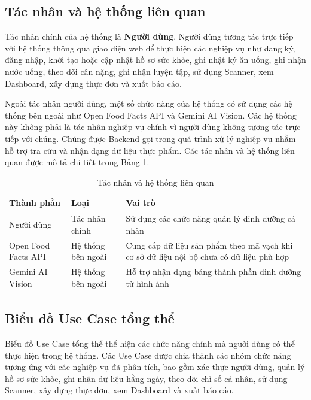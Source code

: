 \documentclass[12pt, a4paper]{report}
\begin{document}
\subsection{Tác nhân và hệ thống liên quan}Tác nhân chính của hệ thống là \textbf{Người dùng}. Người dùng tương tác trực tiếp với hệ thống thông qua giao diện web để thực hiện các nghiệp vụ như đăng ký, đăng nhập, khởi tạo hoặc cập nhật hồ sơ sức khỏe, ghi nhật ký ăn uống, ghi nhận nước uống, theo dõi cân nặng, ghi nhận luyện tập, sử dụng Scanner, xem Dashboard, xây dựng thực đơn và xuất báo cáo.

Ngoài tác nhân người dùng, một số chức năng của hệ thống có sử dụng các hệ thống bên ngoài như Open Food Facts API và Gemini AI Vision. Các hệ thống này không phải là tác nhân nghiệp vụ chính vì người dùng không tương tác trực tiếp với chúng. Chúng được Backend gọi trong quá trình xử lý nghiệp vụ nhằm hỗ trợ tra cứu và nhận dạng dữ liệu thực phẩm. Các tác nhân và hệ thống liên quan được mô tả chi tiết trong Bảng \ref{tab:tac_nhan}.

\begin{table}[htbp]
\centering
\caption{Tác nhân và hệ thống liên quan}
\label{tab:tac_nhan}
\begin{tabular}{|>{\raggedright\arraybackslash}p{4cm}|>{\raggedright\arraybackslash}p{4cm}|p{7cm}|}
\hline
\textbf{Thành phần} & \textbf{Loại} & \textbf{Vai trò} \\
\hline
Người dùng & Tác nhân chính & Sử dụng các chức năng quản lý dinh dưỡng cá nhân \\
\hline
Open Food Facts API & Hệ thống bên ngoài & Cung cấp dữ liệu sản phẩm theo mã vạch khi cơ sở dữ liệu nội bộ chưa có dữ liệu phù hợp \\
\hline
Gemini AI Vision & Hệ thống bên ngoài & Hỗ trợ nhận dạng bảng thành phần dinh dưỡng từ hình ảnh \\
\hline
\end{tabular}
\end{table}
\subsection{Biểu đồ Use Case tổng thể}Biểu đồ Use Case tổng thể thể hiện các chức năng chính mà người dùng có thể thực hiện trong hệ thống. Các Use Case được chia thành các nhóm chức năng tương ứng với các nghiệp vụ đã phân tích, bao gồm xác thực người dùng, quản lý hồ sơ sức khỏe, ghi nhận dữ liệu hằng ngày, theo dõi chỉ số cá nhân, sử dụng Scanner, xây dựng thực đơn, xem Dashboard và xuất báo cáo.
\end{document}
